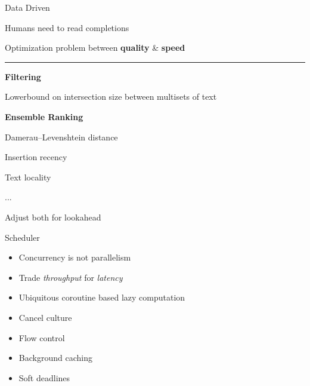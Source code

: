 \documentclass{beamer}
\begin{document}
\begin{frame}{Data Driven}

	Humans need to read completions

	Optimization problem between \textbf{quality} \& \textbf{speed}

	\rule{\textwidth}{0.1em}

	\begin{multicols}{2}

		\textbf{Filtering}

		Lowerbound on intersection size between multisets of text

		\columnbreak

		\textbf{Ensemble Ranking}

		Damerau–Levenshtein distance

		Insertion recency

		Text locality

		...

	\end{multicols}

	Adjust both for lookahead

\end{frame}


\begin{frame}{Scheduler}

	\begin{itemize}

		\item Concurrency is not parallelism

		\item Trade \textit{throughput} for \textit{latency}

		\item Ubiquitous coroutine based lazy computation

		\item Cancel culture

		\item Flow control

		\item Background caching

		\item Soft deadlines

	\end{itemize}

\end{frame}
\end{document}
